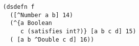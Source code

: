 \begin{lstlisting}[style=reclojureClojure,frame=single]
(dsdefn f 
  ([^Number a b] 14)
  (^{a Boolean
     c (satisfies int?)} [a b c d] 15)
  ( [a b ^Double c d] 16))
\end{lstlisting}
